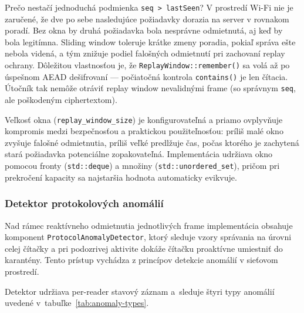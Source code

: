 Prečo nestačí jednoduchá podmienka \texttt{seq > lastSeen}? V prostredí Wi-Fi nie je zaručené, že dve po sebe nasledujúce požiadavky dorazia na server v rovnakom poradí. Bez okna by druhá požiadavka bola nesprávne odmietnutá, aj keď by bola legitímna. Sliding window toleruje krátke zmeny poradia, pokiaľ správa ešte nebola videná, a tým znižuje podiel falošných odmietnutí pri zachovaní replay ochrany. Dôležitou vlastnosťou je, že \texttt{ReplayWindow::remember()} sa volá až po úspešnom AEAD dešifrovaní --- počiatočná kontrola \texttt{contains()} je len čítacia. Útočník tak nemôže otráviť replay window nevalidnými frame (so správnym \texttt{seq}, ale poškodeným ciphertextom).

Veľkosť okna (\texttt{replay\_window\_size}) je konfigurovateľná a priamo ovplyvňuje kompromis medzi bezpečnosťou a praktickou použiteľnosťou: príliš malé okno zvyšuje falošné odmietnutia, príliš veľké predlžuje čas, počas ktorého je zachytená stará požiadavka potenciálne zopakovateľná. Implementácia udržiava okno pomocou fronty (\texttt{std::deque}) a množiny (\texttt{std::unordered\_set}), pričom pri prekročení kapacity sa najstaršia hodnota automaticky evikvuje.


\subsubsection{Detektor protokolových anomálií}
\label{sec:anomaly_detector}

Nad rámec reaktívneho odmietnutia jednotlivých frame implementácia obsahuje komponent \texttt{ProtocolAnomalyDetector}, ktorý sleduje vzory správania na úrovni celej čítačky a pri podozrivej aktivite dokáže čítačku proaktívne umiestniť do karantény. Tento prístup vychádza z princípov detekcie anomálií v sieťovom prostredí\cite{NIST80094}.

Detektor udržiava per-reader stavový záznam a~sleduje štyri typy anomálií uvedené v~tabuľke~\ref{tab:anomaly-types}.

